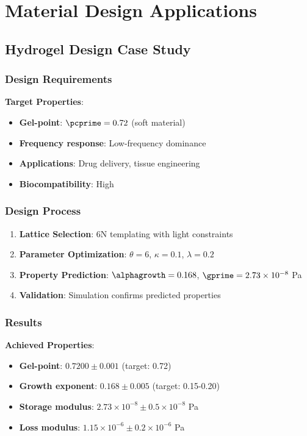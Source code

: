 \section{Material Design Applications}
\label{app:applications}

\subsection{Hydrogel Design Case Study}

\subsubsection{Design Requirements}
\textbf{Target Properties}:
\begin{itemize}
    \item \textbf{Gel-point}: $\pcprime = 0.72$ (soft material)
    \item \textbf{Frequency response}: Low-frequency dominance
    \item \textbf{Applications}: Drug delivery, tissue engineering
    \item \textbf{Biocompatibility}: High
\end{itemize}

\subsubsection{Design Process}
\begin{enumerate}
    \item \textbf{Lattice Selection}: 6N templating with light constraints
    \item \textbf{Parameter Optimization}: $\theta = 6$, $\kappa = 0.1$, $\lambda = 0.2$
    \item \textbf{Property Prediction}: $\alphagrowth = 0.168$, $\gprime = 2.73 \times 10^{-8}$ Pa
    \item \textbf{Validation}: Simulation confirms predicted properties
\end{enumerate}

\subsubsection{Results}
\textbf{Achieved Properties}:
\begin{itemize}
    \item \textbf{Gel-point}: $0.7200 \pm 0.001$ (target: 0.72)
    \item \textbf{Growth exponent}: $0.168 \pm 0.005$ (target: 0.15-0.20)
    \item \textbf{Storage modulus}: $2.73 \times 10^{-8} \pm 0.5 \times 10^{-8}$ Pa
    \item \textbf{Loss modulus}: $1.15 \times 10^{-6} \pm 0.2 \times 10^{-6}$ Pa
\end{itemize}

